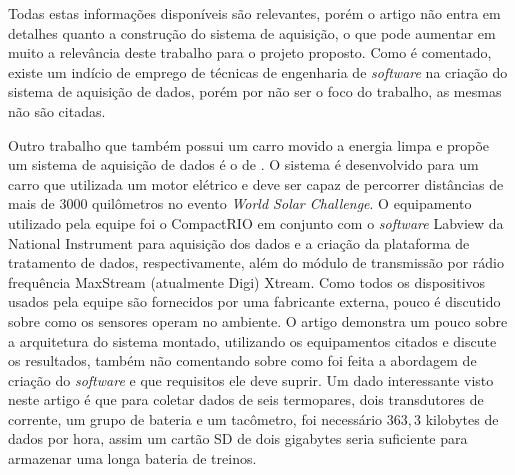 Todas estas informações disponíveis são relevantes, porém o artigo não entra em detalhes quanto a construção do sistema de aquisição, o que pode aumentar em muito a relevância deste trabalho para o projeto proposto. Como é comentado, existe um indício de emprego de técnicas de engenharia de \textit{software} na criação do sistema de aquisição de dados, porém por não ser o foco do trabalho, as mesmas não são citadas. 

Outro trabalho que também possui um carro movido a energia limpa e propõe um sistema de aquisição de dados é o de . O sistema é desenvolvido para um carro que utilizada um motor elétrico e deve ser capaz de percorrer distâncias de mais de 3000 quilômetros no evento \textit{World Solar Challenge}. O equipamento utilizado pela equipe foi o CompactRIO em conjunto com o \textit{software} Labview da National Instrument para aquisição dos dados e a criação da plataforma de tratamento de dados, respectivamente, além do módulo de transmissão por rádio frequência MaxStream (atualmente Digi) Xtream. Como todos os dispositivos usados pela equipe são fornecidos por uma fabricante externa, pouco é discutido sobre como os sensores operam no ambiente. O artigo demonstra um pouco sobre a arquitetura do sistema montado, utilizando os equipamentos citados e discute os resultados, também não comentando sobre como foi feita a abordagem de criação do \textit{software} e que requisitos ele deve suprir. Um dado interessante visto neste artigo é que para coletar dados de seis termopares, dois transdutores de corrente, um grupo de bateria e um tacômetro, foi necessário $363,3$ kilobytes de dados por hora, assim um cartão SD de dois gigabytes seria suficiente para armazenar uma longa bateria de treinos. 


